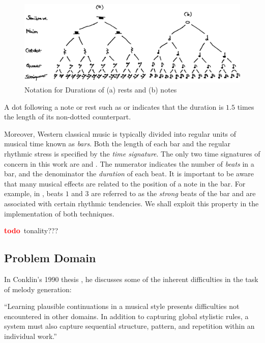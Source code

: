 \documentclass[12pt,a4paper,twoside,openright]{report}
\newcommand{\todo}{\textcolor{red}{\textbf{todo}~}}
\begin{document}
\begin{figure}[H]
\centering
\includegraphics[width=400pt]{figs/note_values_tmp.jpg}
\caption{Notation for Durations of (a) rests and (b) notes}
\label{fig:note-values}
\end{figure}

A dot following a note or rest such as \crotchetDotted{} or \quaverRestDotted{}
indicates that the duration is $1.5$ times the length of its non-dotted
counterpart.

Moreover, Western classical music is typically divided into regular units of
musical time known as \emph{bars}. Both the length of each bar and the regular
rhythmic stress is specified by the \emph{time signature}. The only two time
signatures of concern in this work are  and
. The numerator indicates the number of \emph{beats} in
a bar, and the denominator the \emph{duration} of each beat. It is important to
be aware that many musical effects are related to the position of a note in the
bar. For example, in , beats $1$ and $3$ are referred to
as the \emph{strong} beats of the bar and are associated with certain rhythmic
tendencies. We shall exploit this property in the implementation of both
techniques.

\todo tonality???

\subsection{Problem Domain}

In Conklin's 1990 thesis \cite{conklin1990prediction}, he discusses some of the
inherent difficulties in the task of melody generation:

\begin{displayquote}
``Learning plausible continuations in a musical style presents difficulties not
encountered in other domains. In addition to capturing global stylistic rules, a
system must also capture sequential structure, pattern, and repetition within an
individual work.''
\end{displayquote}
\end{document}
